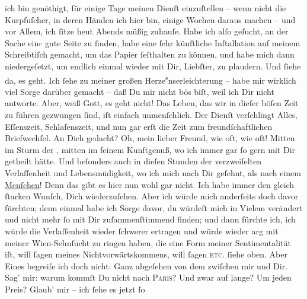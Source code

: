 \begin{ledgroupsized}[t]{13cm}
               ich bin genöthigt, für einige Tage meinen Dienſt einzuſtellen – wenn nicht die
               Kurpfuſcher, in deren Händen ich hier bin, einige Wochen daraus machen – und vor
               Allem, ich ſitze heut{ }Abends müßig zuhauſe. Habe ich alſo geſucht, an der Sache
                  ein\textcolor{gray}{e} gute Seite zu finden, habe eine ſehr künſtliche
               Inſtallation auf meinem Schreibtiſch gemacht, um das Papier ſeſthalten zu können, und
               habe mich dann niedergeſetzt, um {\pb}endlich einmal
               wieder mit Dir, Liebſter, zu plaudern. Und ſiehe da, es geht.\pend
           \pstart
           Ich ſehe zu meiner großen Herze\substVorne{}\textsuperscript{s}\substDazwischen{}n\substHinten{}serleichterung – habe mir wirklich viel Sorge darüber gemacht – daß Du mir
               nicht bös biſt, weil ich Dir nicht antworte. Aber, weiß Gott, es geht nicht! Das
               Leben, das wir in dieſer böſen Zeit zu führen gezwungen ſind, iſt einfach
               unmenſchlich. Der Dienſt verſchlingt Alles, Eſſenszeit, Schlafenszeit, und nun gar
               erſt die {\pb}Zeit zum freundſchaftlichen Briefwechſel.
               An Dich gedacht? Oh, mein lieber Freund, wie oft, wie oft! Mitten im Sturm der
                  \label{T_L02704-1v}\label{T_L02704-1h}, mitten
               im feinem Kunſtgenuß, wo ich immer gar ſo gern mit Dir getheilt hätte. Und beſonders
               auch in dieſen Stunden der verzweifelten Verlaſſenheit und Lebensmüdigkeit, wo ich
               mich nach Dir geſehnt, als nach einem \uline{Menſchen}! Denn
               das gibt es hier nun wohl gar nicht. Ich habe immer den gleich ſtarken Wunſch, Dich
                  {\pb}wiederzuſehen. Aber ich würde mich anderſeits
               doch davor fürchten; denn einmal habe ich Sorge davor, du würdeſt mich in Vielem
               verändert und nicht mehr ſo mit Dir zuſammenſtimmend finden; und dann fürchte ich,
               ich würde die Verlaſſenheit wieder ſchwerer ertragen und würde wieder arg mit meiner
                  Wien-Sehnſucht zu ringen haben, die eine Form
               meiner Sentimentalität iſt, will ſagen meines Nichtvorwärtskommens, will ſagen \textsc{etc.} ſiehe oben. {\pb}Aber
               Eines begreiſe ich doch nicht: Ganz abgeſehen von dem zwiſchen mir und Dir. Sag’ mir:
               warum kommſt Du nicht nach \textsc{Paris}? Und zwar auf lange? Um jeden Preis? Glaub’ mir – ich ſehe es jetzt ſo

\end{ledgroupsized}
